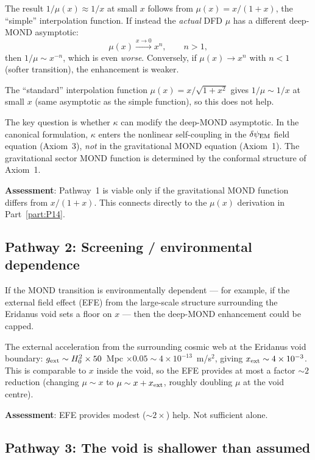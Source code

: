 \documentclass[11pt]{article}
\newcommand{\ee}[1]{\times 10^{#1}}
\newcommand{\dpsiEM}{\delta\psi_{\rm EM}}
\newcommand{\Hzero}{H_0}
\newcommand{\mufd}{\mu}
\begin{document}
The result $1/\mufd(x) \approx 1/x$ at small $x$ follows from
$\mufd(x) = x/(1+x)$, the ``simple'' interpolation function. If instead
the \emph{actual} DFD $\mufd$ has a different deep-MOND asymptotic:
\begin{equation}
\mufd(x) \xrightarrow{x \to 0} x^n, \qquad n > 1,
\label{eq:mu-power}
\end{equation}
then $1/\mufd \sim x^{-n}$, which is even \emph{worse}. Conversely,
if $\mufd(x) \to x^n$ with $n < 1$ (softer transition), the
enhancement is weaker.

The ``standard'' interpolation function
$\mufd(x) = x/\sqrt{1+x^2}$ gives $1/\mufd \sim 1/x$ at small $x$
(same asymptotic as the simple function), so this does not help.

The key question is whether $\kappa$ can modify the deep-MOND
asymptotic. In the canonical formulation, $\kappa$ enters the
nonlinear self-coupling in the $\dpsiEM$ field equation
(Axiom~3), \emph{not} in the gravitational MOND equation
(Axiom~1). The gravitational sector MOND function is determined by
the conformal structure of Axiom~1.

\textbf{Assessment}: Pathway~1 is viable only if the gravitational
MOND function differs from $x/(1+x)$. This connects directly to
the $\mufd(x)$ derivation in Part~\ref{part:P14}.

\subsection{Pathway 2: Screening / environmental dependence}

If the MOND transition is environmentally dependent --- for example,
if the external field effect (EFE) from the large-scale structure
surrounding the Eridanus void sets a floor on $x$ --- then the
deep-MOND enhancement could be capped.

The external acceleration from the surrounding cosmic web at the
Eridanus void boundary: $g_{\rm ext} \sim \Hzero^2 \times 50$~Mpc
$\times 0.05 \sim 4\ee{-13}$~m/s$^2$, giving $x_{\rm ext}
\sim 4\ee{-3}$. This is comparable to $x$ inside the void, so the
EFE provides at most a factor $\sim 2$ reduction (changing
$\mufd \sim x$ to $\mufd \sim x + x_{\rm ext}$, roughly doubling
$\mufd$ at the void centre).

\textbf{Assessment}: EFE provides modest ($\sim 2\times$) help. Not
sufficient alone.

\subsection{Pathway 3: The void is shallower than assumed}
\end{document}
